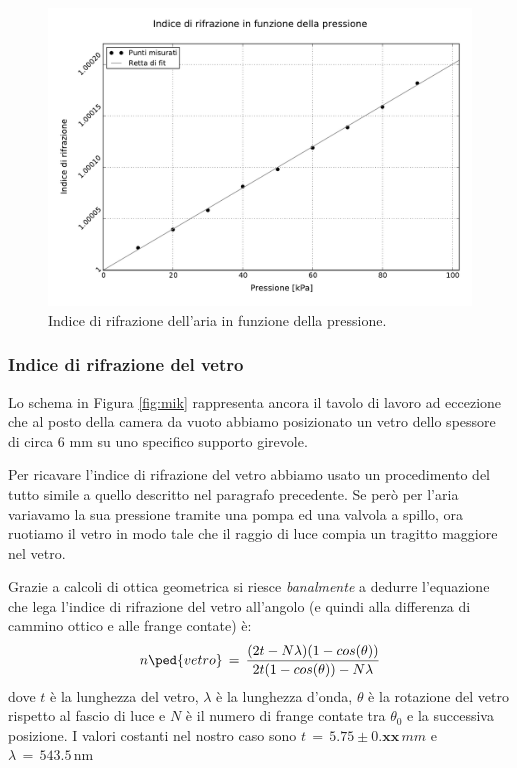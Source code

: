 
\begin{figure}[t]
    \centering
        \includegraphics[width=\textwidth]{graph.pdf}
        \caption{Indice di rifrazione dell'aria in funzione della pressione.}
        \label{fig:enne_press}
\end{figure}

\subsubsection{Indice di rifrazione del vetro}


Lo schema in Figura \ref{fig:mik} rappresenta ancora il tavolo di lavoro ad eccezione che al posto della camera da vuoto abbiamo posizionato un vetro dello spessore di circa 6 \si{\milli\metre} su uno specifico supporto girevole.

Per ricavare l'indice di rifrazione del vetro abbiamo usato un procedimento del tutto simile a quello descritto nel paragrafo precedente.
Se però per l'aria variavamo la sua pressione tramite una pompa ed una valvola a spillo, ora ruotiamo il vetro in modo tale che il raggio di luce compia un tragitto maggiore nel vetro. %

Grazie a calcoli di ottica geometrica si riesce \emph{banalmente} a dedurre l'equazione che lega l'indice di rifrazione del vetro all'angolo (e quindi alla differenza di cammino ottico e alle frange contate) è:
\begin{equation}
	n\ped{vetro} \, = \, \frac{(2t - N \lambda) (1 - cos(\theta))}{2t(1-cos(\theta))-N\lambda}
\end{equation}
dove $t$ è la lunghezza del vetro, $\lambda$ è la lunghezza d'onda, $\theta$ è la rotazione del vetro rispetto al fascio di luce %
e $N$ è il numero di frange contate tra $\theta_0$ e la successiva posizione.
I valori costanti nel nostro caso sono $t \,=\, 5.75 \pm 0.\textbf{xx} \, mm$ e $\lambda \, = \, 543.5 \, \si{\nano\metre}$

